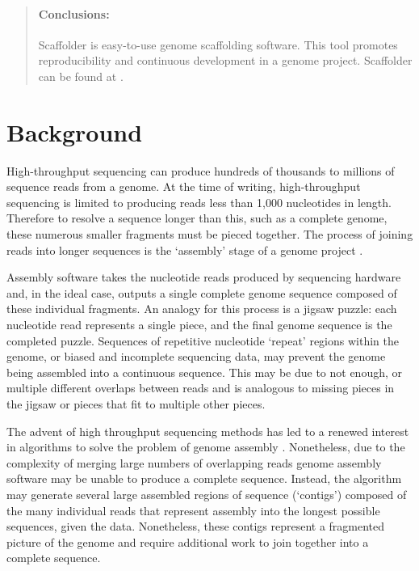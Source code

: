 \documentclass[10pt]{bmc_article}
\newenvironment{bmcformat}{\begin{raggedright}\baselineskip20pt\sloppy\setboolean{publ}{false}}{\end{raggedright}\baselineskip20pt\sloppy}
\begin{document}
\begin{bmcformat}
\begin{abstract}
  \paragraph*{Conclusions:} Scaffolder is easy-to-use genome scaffolding
  software. This tool promotes reproducibility and continuous development in a
  genome project. Scaffolder can be found at \scaffolder.

\end{abstract}


\clearpage

\section*{Background} %

High-throughput sequencing can produce hundreds of thousands to millions of
sequence reads from a genome. At the time of writing, high-throughput
sequencing is limited to producing reads less than 1,000 nucleotides in length.
Therefore to resolve a sequence longer than this, such as a complete genome,
these numerous smaller fragments must be pieced together. The process of
joining reads into longer sequences is the `assembly' stage of a genome project
\cite{miller2010}. \pb

Assembly software takes the nucleotide reads produced by sequencing hardware
and, in the ideal case, outputs a single complete genome sequence composed of
these individual fragments. An analogy for this process is a jigsaw puzzle:
each nucleotide read represents a single piece, and the final genome sequence
is the completed puzzle. Sequences of repetitive nucleotide `repeat' regions
within the genome, or biased and incomplete sequencing data, may prevent the
genome being assembled into a continuous sequence. This may be due to not
enough, or multiple different overlaps between reads and is analogous to
missing pieces in the jigsaw or pieces that fit to multiple other pieces. \pb

The advent of high throughput sequencing methods has led to a renewed interest
in algorithms to solve the problem of genome assembly \cite{pop2008,pop2009}.
Nonetheless, due to the complexity of merging large numbers of overlapping
reads genome assembly software may be unable to produce a complete sequence.
Instead, the algorithm may generate several large assembled regions of
sequence (`contigs') composed of the many individual reads that represent
assembly into the longest possible sequences, given the data. Nonetheless,
these contigs represent a fragmented picture of the genome and require
additional work to join together into a complete sequence. \pb


\end{bmcformat}
\end{document}
